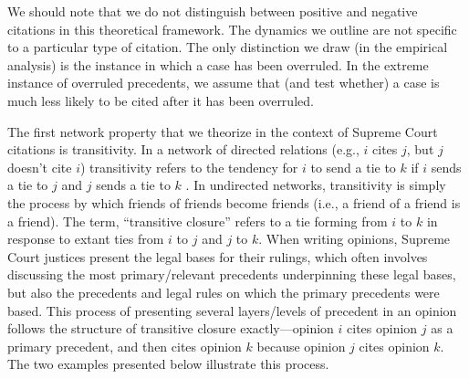 \documentclass{cup-pan}
\begin{document}
We should note that we do not distinguish between positive and negative citations in this theoretical framework. The dynamics we outline are not specific to a particular type of citation. The only distinction we draw (in the empirical analysis) is the instance in which a case has been overruled. In the extreme instance of overruled precedents, we assume that (and test whether) a case is much less likely to be cited after it has been overruled.

The first network property that we theorize in the context of Supreme Court citations is transitivity. In a network of directed relations (e.g., $i$ cites $j$, but $j$ doesn't cite $i$) transitivity refers to the tendency for $i$ to send a tie to $k$ if $i$ sends a tie to $j$ and $j$ sends a tie to $k$ \citep{holland1971transitivity,hallinan1990sex}. In undirected networks, transitivity is simply the process by which friends of friends become friends (i.e., a friend of a friend is a friend). The term, ``transitive closure'' refers to a tie forming from $i$ to $k$ in response to extant ties from $i$ to $j$ and $j$ to $k$. When writing opinions, Supreme Court justices present the legal bases for their rulings, which often involves discussing the most primary/relevant precedents underpinning these legal bases, but also the precedents and legal rules on which the primary precedents were based. This process of presenting several layers/levels of precedent in an opinion follows the structure of transitive closure exactly---opinion $i$ cites opinion $j$ as a primary precedent, and then cites opinion $k$ because opinion $j$ cites opinion $k$. The two examples presented below illustrate this process.
\end{document}
